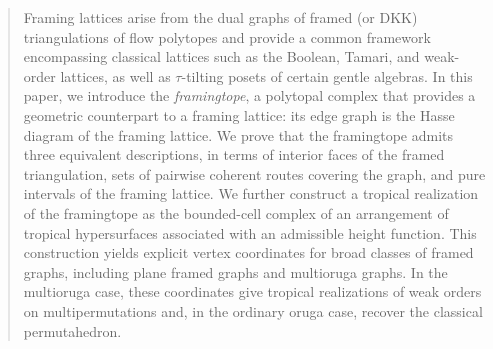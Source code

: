 \documentclass[12pt, reqno]{amsart}
\theoremstyle{plain}
\theoremstyle{definition}
\numberwithin{equation}{section}
\begin{document}
\begin{abstract}


Framing lattices arise from the dual graphs of framed (or DKK) triangulations of flow polytopes and provide a common framework encompassing classical lattices such as the Boolean, Tamari, and weak-order lattices, as well as $\tau$-tilting posets of certain gentle algebras. In this paper, we introduce the \emph{framingtope}, a polytopal complex that provides a geometric counterpart to a framing lattice: its edge graph is the Hasse diagram of the framing lattice. We prove that the framingtope admits three equivalent descriptions, in terms of interior faces of the framed triangulation, sets of pairwise coherent routes covering the graph, and pure intervals of the framing lattice. We further construct a tropical realization of the framingtope as the bounded-cell complex of an arrangement of tropical hypersurfaces associated with an admissible height function. This construction yields explicit vertex coordinates for broad classes of framed graphs, including plane framed graphs and multioruga graphs. In the multioruga case, these coordinates give tropical realizations of weak orders on multipermutations and, in the ordinary oruga case, recover the classical permutahedron.
\end{abstract}
\maketitle
\tableofcontents
\end{document}
